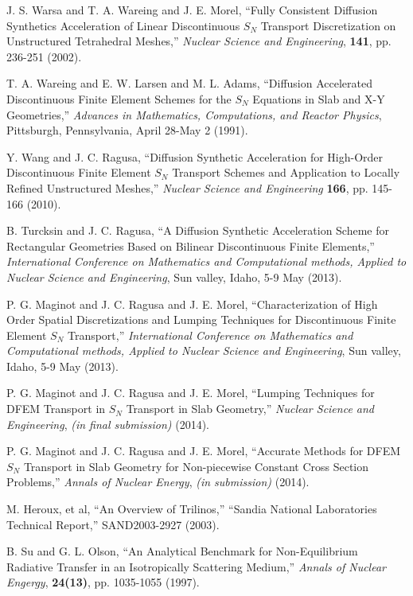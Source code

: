 \documentclass[final,3p,times]{elsarticle}
\begin{document}
\begin{thebibliography}{300}
 J. S. Warsa and T. A. Wareing and J. E. Morel, ``Fully Consistent Diffusion Synthetics Acceleration of Linear Discontinuous $S_N$ Transport Discretization on Unstructured Tetrahedral Meshes,'' {\it Nuclear Science and Engineering}, {\bf 141}, pp. 236-251 (2002).

 T. A. Wareing and E. W. Larsen and M. L. Adams, ``Diffusion Accelerated Discontinuous Finite Element Schemes for the $S_N$ Equations in Slab and X-Y Geometries,'' {\it Advances in Mathematics, Computations, and Reactor Physics}, Pittsburgh, Pennsylvania, April 28-May 2 (1991).

 Y. Wang and J. C. Ragusa, ``Diffusion Synthetic Acceleration for High-Order Discontinuous Finite Element $S_N$ Transport Schemes and Application to Locally Refined Unstructured Meshes,'' {\it Nuclear Science and Engineering} {\bf 166}, pp. 145-166 (2010).

 B. Turcksin and J. C. Ragusa, ``A Diffusion Synthetic Acceleration Scheme for Rectangular Geometries Based on Bilinear Discontinuous Finite Elements,'' {\it International Conference on Mathematics and Computational methods, Applied to Nuclear Science and Engineering}, Sun valley, Idaho, 5-9 May (2013).

 P. G. Maginot and J. C. Ragusa and J. E. Morel, ``Characterization of High Order Spatial Discretizations and Lumping Techniques for Discontinuous Finite Element $S_N$ Transport,'' {\it International Conference on Mathematics and Computational methods, Applied to Nuclear Science and Engineering}, Sun valley, Idaho, 5-9 May (2013).

 P. G. Maginot and J. C. Ragusa and J. E. Morel, ``Lumping Techniques for DFEM Transport in $S_N$ Transport in Slab Geometry,'' {\it Nuclear Science and Engineering}, {\it (in final submission)} (2014).

 P. G. Maginot and J. C. Ragusa and J. E. Morel, ``Accurate Methods for DFEM $S_N$ Transport in Slab Geometry for Non-piecewise Constant Cross Section Problems,'' {\it Annals of Nuclear Energy}, {\it (in submission) } (2014).

 M. Heroux, et al, ``An Overview of Trilinos,'' ``Sandia National Laboratories Technical Report,'' SAND2003-2927 (2003).

 B. Su and G. L. Olson, ``An Analytical Benchmark for Non-Equilibrium Radiative Transfer in an Isotropically Scattering Medium,'' {\em Annals of Nuclear Engergy}, {\bf 24(13)}, pp. 1035-1055 (1997).


\end{thebibliography}
\end{document}
